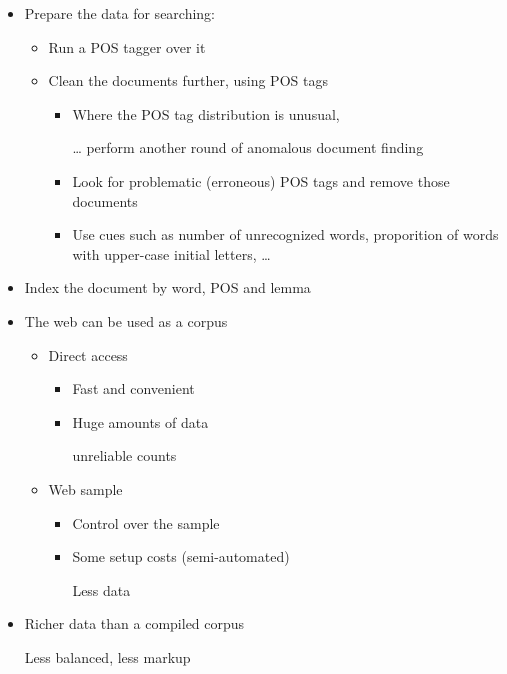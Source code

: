 \documentclass[a4paper,landscape,headrule,footrule,dvips]{foils}
\begin{document}
\begin{CJK}{UTF8}{min}
\begin{itemize}
\item Prepare the  data  for searching:
  \begin{itemize}
  \item Run a POS tagger over it
  \item Clean the documents further, using POS tags
    \begin{itemize}
    \item Where the POS tag distribution is unusual,
    \item[\ldots] perform another round of anomalous document
finding
\item Look for problematic (erroneous) POS tags and
remove those documents
\item Use cues such as number of unrecognized words,
proporition of words with upper-case initial letters, \ldots
\end{itemize}
\end{itemize}
\item Index the document by word, POS and lemma
\end{itemize}


\MyLogo{}
 
\begin{itemize}
\item The web can be used as a corpus
  \begin{itemize}
  \item Direct access
    \begin{itemize}
    \item Fast and convenient
    \item Huge amounts of data
    \item[\Bad] unreliable counts 
    \end{itemize}
  \item Web sample
    \begin{itemize}
    \item Control over the sample
    \item Some setup costs (semi-automated)
    \item[\Bad] Less data 
    \end{itemize}
  \end{itemize}
\item Richer data than a compiled corpus
\item[\Bad] Less balanced, less markup
\end{itemize}




\end{CJK}
\end{document}
